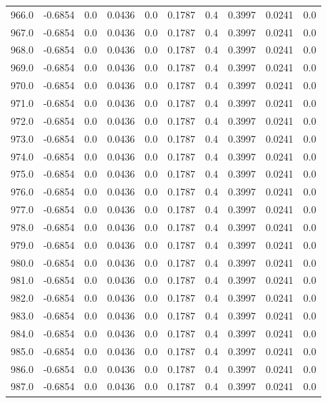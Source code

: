 \begin{longtable}{lrrrrrrrrr}
966.0 & -0.6854 & 0.0 & 0.0436 & 0.0 & 0.1787 & 0.4 & 0.3997 & 0.0241 & 0.0 \\
967.0 & -0.6854 & 0.0 & 0.0436 & 0.0 & 0.1787 & 0.4 & 0.3997 & 0.0241 & 0.0 \\
968.0 & -0.6854 & 0.0 & 0.0436 & 0.0 & 0.1787 & 0.4 & 0.3997 & 0.0241 & 0.0 \\
969.0 & -0.6854 & 0.0 & 0.0436 & 0.0 & 0.1787 & 0.4 & 0.3997 & 0.0241 & 0.0 \\
970.0 & -0.6854 & 0.0 & 0.0436 & 0.0 & 0.1787 & 0.4 & 0.3997 & 0.0241 & 0.0 \\
971.0 & -0.6854 & 0.0 & 0.0436 & 0.0 & 0.1787 & 0.4 & 0.3997 & 0.0241 & 0.0 \\
972.0 & -0.6854 & 0.0 & 0.0436 & 0.0 & 0.1787 & 0.4 & 0.3997 & 0.0241 & 0.0 \\
973.0 & -0.6854 & 0.0 & 0.0436 & 0.0 & 0.1787 & 0.4 & 0.3997 & 0.0241 & 0.0 \\
974.0 & -0.6854 & 0.0 & 0.0436 & 0.0 & 0.1787 & 0.4 & 0.3997 & 0.0241 & 0.0 \\
975.0 & -0.6854 & 0.0 & 0.0436 & 0.0 & 0.1787 & 0.4 & 0.3997 & 0.0241 & 0.0 \\
976.0 & -0.6854 & 0.0 & 0.0436 & 0.0 & 0.1787 & 0.4 & 0.3997 & 0.0241 & 0.0 \\
977.0 & -0.6854 & 0.0 & 0.0436 & 0.0 & 0.1787 & 0.4 & 0.3997 & 0.0241 & 0.0 \\
978.0 & -0.6854 & 0.0 & 0.0436 & 0.0 & 0.1787 & 0.4 & 0.3997 & 0.0241 & 0.0 \\
979.0 & -0.6854 & 0.0 & 0.0436 & 0.0 & 0.1787 & 0.4 & 0.3997 & 0.0241 & 0.0 \\
980.0 & -0.6854 & 0.0 & 0.0436 & 0.0 & 0.1787 & 0.4 & 0.3997 & 0.0241 & 0.0 \\
981.0 & -0.6854 & 0.0 & 0.0436 & 0.0 & 0.1787 & 0.4 & 0.3997 & 0.0241 & 0.0 \\
982.0 & -0.6854 & 0.0 & 0.0436 & 0.0 & 0.1787 & 0.4 & 0.3997 & 0.0241 & 0.0 \\
983.0 & -0.6854 & 0.0 & 0.0436 & 0.0 & 0.1787 & 0.4 & 0.3997 & 0.0241 & 0.0 \\
984.0 & -0.6854 & 0.0 & 0.0436 & 0.0 & 0.1787 & 0.4 & 0.3997 & 0.0241 & 0.0 \\
985.0 & -0.6854 & 0.0 & 0.0436 & 0.0 & 0.1787 & 0.4 & 0.3997 & 0.0241 & 0.0 \\
986.0 & -0.6854 & 0.0 & 0.0436 & 0.0 & 0.1787 & 0.4 & 0.3997 & 0.0241 & 0.0 \\
987.0 & -0.6854 & 0.0 & 0.0436 & 0.0 & 0.1787 & 0.4 & 0.3997 & 0.0241 & 0.0 \\

\end{longtable}
